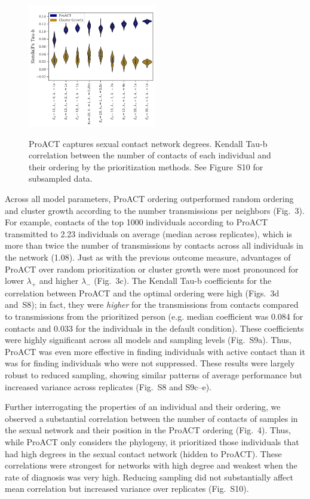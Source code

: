 \documentclass[oupdraft]{sysbio}
\newcommand{\PLWH}{sample\xspace}
\begin{document}
\begin{figure}[!tp]
\centering
{\footnotesize
\includegraphics[width=0.5\textwidth]{Fig4.pdf}%
\\
}
\caption{ProACT captures sexual contact network degrees.
 Kendall Tau-b correlation between the number of contacts of each individual and their ordering by the prioritization methods.
 See Figure~S10 for subsampled data. 
 }
\label{fig:efficacy-conc}
\end{figure}

Across all model parameters, ProACT ordering outperformed random ordering and cluster growth according to the number transmissions per neighbors (Fig.~3).
For example, contacts of the top 1000 individuals according to ProACT transmitted to 2.23 individuals on average (median across replicates), which is more than twice the number of transmissions by contacts across all individuals in the network (1.08).
Just as with the previous outcome measure, advantages of ProACT over random prioritization or cluster growth were most pronounced for lower $\lambda_{+}$ and higher $\lambda_{-}$ (Fig.~3c). 
The Kendall Tau-b coefficients for the correlation between ProACT and the optimal ordering were high (Figs.~3d and~S8); in fact, they were \textit{higher} for the transmissions from contacts compared to transmissions from the prioritized person (e.g. median coefficient was 0.084 for contacts and 0.033 for the individuals in the default condition). 
These coefficients were highly significant across all models and sampling levels (Fig.~S9a).
Thus, ProACT was even more effective in finding individuals with active contact than it was for finding individuals who were not suppressed. 
These results were largely robust to reduced sampling, showing similar patterns of average performance but increased variance across replicates (Fig.~S8 and S9c--e).

Further interrogating the properties of an individual and their ordering, we observed a substantial correlation between the number of contacts of \PLWH{s} in the sexual network and their position in the ProACT ordering (Fig.~4). 
Thus, while ProACT only considers the phylogeny, it  prioritized those individuals that had high degrees in the sexual contact network (hidden to ProACT). 
These correlations were strongest for networks with high degree and weakest when the rate of diagnosis was very high. 
Reducing sampling did not substantially affect mean correlation but increased variance over replicates (Fig.~S10).
\end{document}
